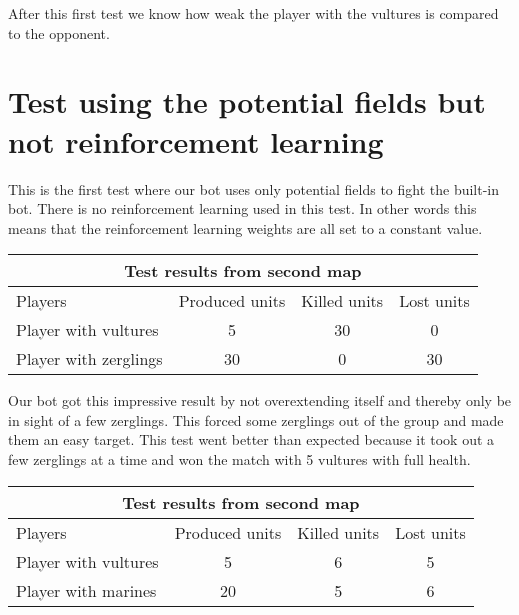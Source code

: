 After this first test we know how weak the player with the vultures is compared to the opponent.
\newpage
\section{Test using the potential fields but not reinforcement learning} %
This is the first test where our bot uses only potential fields  to fight the built-in bot. There is no reinforcement learning used in this test. In other words this means that the reinforcement learning weights are all set to a constant value.\\

\begin{centering}
\begin{table}
 \begin{tabular}{|l|c|c|c|}
	\multicolumn{4}{c}{Test results from second map} \\
	\hline
	Players & Produced units & Killed units & Lost units\\
	\hline
	\hline
		Player with vultures & 5 & 30 & 0\\
	\hline
		Player with zerglings & 30 & 0 & 30\\
	\hline

\end{tabular}
\end{table}
\end{centering}

Our bot got this impressive result by not overextending itself and thereby only be in sight of a few zerglings. This forced some zerglings out of the group and made them an easy target. This test went better than expected because it took out a few zerglings at a time and won the match with 5 vultures with full health.\\

\begin{centering}
\begin{table}
 \begin{tabular}{|l|c|c|c|}
	\multicolumn{4}{c}{Test results from second map} \\
	\hline
	Players & Produced units & Killed units & Lost units\\
	\hline
	\hline
		Player with vultures & 5 & 6 & 5\\
	\hline
		Player with marines & 20 & 5 & 6\\
	\hline

\end{tabular}
\end{table}
\end{centering}


